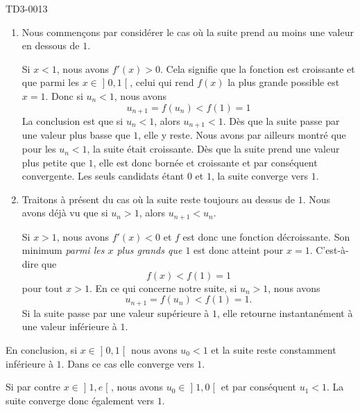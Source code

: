 \begin{corrige}{TD3-0013}
\begin{description}
            \begin{enumerate}
                \item
                    
                    Nous commençons par considérer le cas où la suite prend au moins une valeur en dessous de \( 1\).

                    Si \( x<1\), nous avons \( f'(x)>0\). Cela signifie que la fonction est croissante et que parmi les \( x\in\mathopen] 0 , 1 \mathclose[\), celui qui rend \( f(x)\) la plus grande possible est \( x=1\). Donc si \( u_n<1\), nous avons
    \begin{equation}
        u_{n+1}=f(u_n)<f(1)=1
    \end{equation}
    La conclusion est que si \( u_n<1\), alors \( u_{n+1}<1\). Dès que la suite passe par une valeur plus basse que \( 1\), elle y reste. Nous avons par ailleurs montré que pour les \( u_n<1\), la suite était croissante. Dès que la suite prend une valeur plus petite que \( 1\), elle est donc bornée et croissante et par conséquent convergente. Les seuls candidats étant \( 0\) et \( 1\), la suite converge vers \( 1\).

    
            \item

                Traitons à présent du cas où la suite reste toujours au dessus de \( 1\). Nous avons déjà vu que si \( u_n>1\), alors \( u_{n+1}<u_n\).

                Si \( x>1\), nous avons \( f'(x)<0\) et \( f\) est donc une fonction décroissante. Son minimum \emph{parmi les \( x\) plus grands que \( 1\)} est donc atteint pour \( x=1\). C'est-à-dire que
                \begin{equation}
                    f(x)<f(1)=1
                \end{equation}
                pour tout \( x>1\). En ce qui concerne notre suite, si \( u_n>1\), nous avons
                \begin{equation}
                    u_{n+1}=f(u_n)<f(1)=1.
                \end{equation}
                Si la suite passe par une valeur supérieure à \( 1\), elle retourne instantanément à une valeur inférieure à \( 1\).
    
            \end{enumerate}

    \end{description}
    
    En conclusion, si \( x\in\mathopen] 0 , 1 \mathclose[\) nous avons \( u_0<1\) et la suite reste constamment inférieure à \( 1\). Dans ce cas elle converge vers \( 1\).

    Si par contre \( x\in\mathopen] 1 , e \mathclose[\), nous avons \( u_0\in\mathopen] 1 , 0 \mathclose[\) et par conséquent \( u_1<1\). La suite converge donc également vers \( 1\).

\end{corrige}
